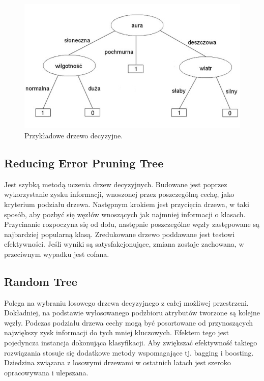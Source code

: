 \documentclass[conference]{IEEEtran}
\begin{document}
\begin{figure}[htbp]
\centerline{\includegraphics[scale=0.4]{pic/drzewo_decyzyjne.jpg}}
\caption{Przykładowe drzewo decyzyjne.}
\label{drzewo_decyzyjne}
\end{figure}

\subsection{Reducing Error Pruning Tree}
Jest szybką metodą uczenia drzew decyzyjnych. Budowane jest poprzez wykorzystanie zysku informacji, wnoszonej przez poszczególną cechę, jako kryterium podziału drzewa. Następnym krokiem jest przycięcia drzewa, w taki sposób, aby pozbyć się węzłów wnoszących jak najmniej informacji o klasach. Przycinanie rozpoczyna się od dołu, następnie poszczególne węzły zastępowane są najbardziej popularną klasą. Zredukowane drzewo poddawane jest testowi efektywności. Jeśli wyniki są satysfakcjonujące, zmiana zostaje zachowana, w przeciwnym wypadku jest cofana.

\subsection{Random Tree}
Polega na wybraniu losowego drzewa decyzyjnego z całej możliwej przestrzeni. Dokładniej, na podstawie wylosowanego podzbioru atrybutów tworzone są kolejne węzły. Podczas podziału drzewa cechy mogą być posortowane od przynoszących największy zysk informacji do tych mniej kluczowych. Efektem tego jest pojedyncza instancja dokonująca klasyfikacji. Aby zwiększać efektywność takiego rozwiązania stosuje się dodatkowe metody wspomagające tj. bagging i boosting. Dziedzina związana z losowymi drzewami w ostatnich latach jest szeroko opracowywana i ulepszana.
\end{document}
